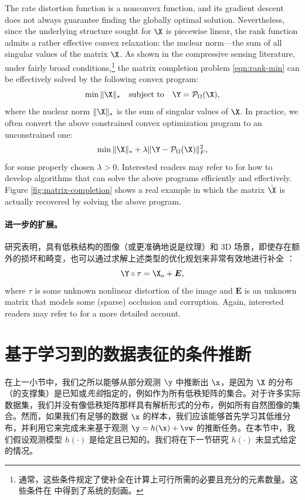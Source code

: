\documentclass[../../book-main_zh.tex]{subfiles}
\begin{document}
The rate distortion function is a nonconvex function, and its gradient
descent does not always guarantee finding the globally optimal
solution. Nevertheless, since the underlying structure sought for
$\X$ is piecewise linear, the rank function admits a rather effective
convex relaxation: the
nuclear norm---the sum of all singular values of the matrix $\X$. As
shown in the compressive sensing literature, under fairly
broad conditions,\footnote{通常，这些条件规定了使补全在计算上可行所需的必要且充分的元素数量。这些条件在 \cite{Wright-Ma-2022} 中得到了系统的刻画。} the matrix
completion problem \eqref{eqn:rank-min}
can be effectively solved by the following convex program:
\begin{equation}
    \min \|\X\|_* \quad \mbox{subject to}
    \quad
    \Y = \mathcal{P}_{\Omega}(\X),
    \label{eqn:nuclear-min}
\end{equation}
where the nuclear norm $\|\X\|_*$ is the sum of singular values of
$\X$. In practice, we often convert the above constrained convex optimization
program to an unconstrained one:
\begin{equation}
    \min \|\X\|_*  + \lambda \|
    \Y - \mathcal{P}_{\Omega}(\X)\|_F^2,
    \label{eqn:nuclear-min-lagrangian}
\end{equation}
for some properly chosen $\lambda > 0$. Interested readers may refer to
\cite{Wright-Ma-2022} for how to develop algorithms that can solve
the above programs efficiently and effectively.
Figure \ref{fig:matrix-completion} shows a real example in which the
matrix $\hat \X$ is actually recovered by solving the above program.

\paragraph{进一步的扩展。}
研究表明，具有低秩结构的图像（或更准确地说是纹理）和 3D 场景，即使存在额外的损坏和畸变，也可以通过求解上述类型的优化规划来非常有效地进行补全 \cite{Zhang2010TILTTI,Liang-ECCV2012,Yi_2023_ICCV}：
\begin{equation}
    \Y \circ \tau = \X_o + \boldsymbol{E},
\end{equation}
where $\tau$ is some unknown nonlinear distortion of the image and
$\boldsymbol{E}$ is an unknown matrix that models some (sparse)
occlusion and corruption. Again, interested readers may refer to
\cite{Wright-Ma-2022} for a more detailed account.

\section{基于学习到的数据表征的条件推断}
在上一小节中，我们之所以能够从部分观测 $\y$ 中推断出 $\x$，是因为 $\X$ 的分布（的支撑集）是已知或{\em 先验}指定的，例如作为所有低秩矩阵的集合。对于许多实际数据集，我们并没有像低秩矩阵那样具有解析形式的分布，例如所有自然图像的集合。然而，如果我们有足够的数据 $\x$ 的样本，我们应该能够首先学习其低维分布，并利用它来完成未来基于观测 $\y = h(\x) + \vw$ 的推断任务。在本节中，我们假设观测模型 $h(\cdot)$ 是给定且已知的。我们将在下一节研究 $h(\cdot)$ 未显式给定的情况。
\end{document}
